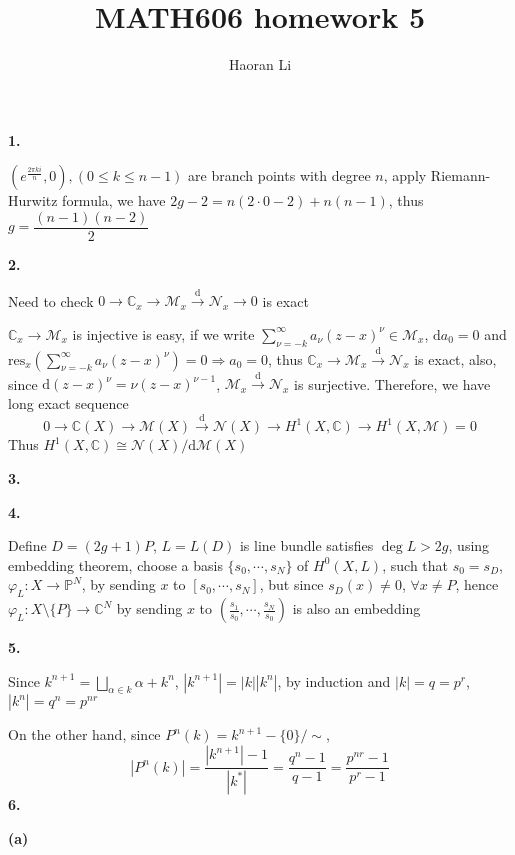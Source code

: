 \documentclass[12pt]{article}
\title{MATH606 homework 5}
\author{Haoran Li}
\date{}
\begin{document}
\maketitle

\textbf{1.} \par
$\left(e^{\frac{2\pi ki}{n}},0\right), (0\leq k\leq n-1)$ are branch points with degree $n$, apply Riemann-Hurwitz formula, we have $2g-2=n(2\cdot 0-2)+n(n-1)$, thus $g=\dfrac{(n-1)(n-2)}{2}$ \par
\textbf{2.} \par
Need to check $0\rightarrow\mathbb{C}_x\rightarrow\mathcal{M}_x\overset{\mathrm{d}}{\rightarrow}\mathcal{N}_x\rightarrow0$ is exact \par
$\mathbb{C}_x\rightarrow\mathcal{M}_x$ is injective is easy, if we write $\displaystyle\sum_{\nu=-k}^\infty a_\nu(z-x)^\nu\in\mathcal{M}_x$, $\mathrm{d}a_0=0$ and $\displaystyle\mathrm{res}_x\left(\sum_{\nu=-k}^\infty a_\nu(z-x)^\nu\right)=0\Rightarrow a_0=0$, thus $\mathbb{C}_x\rightarrow\mathcal{M}_x\overset{\mathrm{d}}{\rightarrow}\mathcal{N}_x$ is exact, also, since $\mathrm{d}(z-x)^\nu=\nu(z-x)^{\nu-1}$, $\mathcal{M}_x\overset{\mathrm{d}}{\rightarrow}\mathcal{N}_x$ is surjective. Therefore, we have long exact sequence
\[
0\rightarrow\mathbb{C}(X)\rightarrow\mathcal{M}(X)\overset{\mathrm{d}}{\rightarrow}\mathcal{N}(X)\rightarrow H^1(X,\mathbb{C})\rightarrow H^1(X,\mathcal{M})=0
\]
Thus $H^1(X,\mathbb{C})\cong\mathcal{N}(X)/\mathrm{d}\mathcal{M}(X)$ \par
\textbf{3.} \par
\textbf{4.} \par
Define $D=(2g+1)P$, $L=L(D)$ is line bundle satisfies $\deg L>2g$, using embedding theorem, choose a basis $\{s_0,\cdots,s_N\}$ of $H^0(X,L)$, such that $s_0=s_D$, $\varphi_L: X\rightarrow\mathbb{P}^N$, by sending $x$ to $[s_0,\cdots,s_N]$, but since $s_D(x)\neq 0$, $\forall x\neq P$, hence $\varphi_L: X\setminus\{P\}\rightarrow\mathbb{C}^N$ by sending $x$ to $\left(\frac{s_1}{s_0},\cdots,\frac{s_N}{s_0}\right)$ is also an embedding \par
\textbf{5.} \par
Since $\displaystyle k^{n+1}=\bigsqcup_{\alpha\in k}\alpha+k^n$, $|k^{n+1}|=|k||k^n|$, by induction and $|k|=q=p^r$, $|k^n|=q^n=p^{nr}$ \par
On the other hand, since $P^n(k)=k^{n+1}-\{0\}\big/\sim$, 
\[
|P^n(k)|=\dfrac{|k^{n+1}|-1}{|k^*|}=\dfrac{q^n-1}{q-1}=\dfrac{p^{nr}-1}{p^r-1}
\]
\textbf{6.} \par
\textbf{(a)} \par
\end{document}
